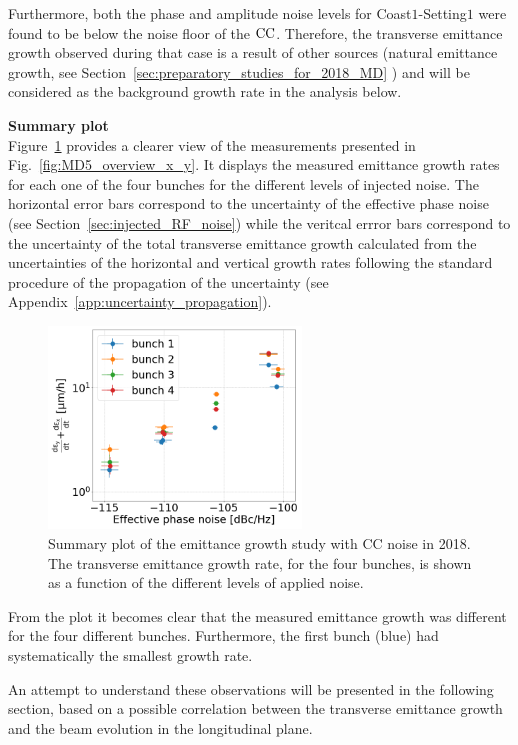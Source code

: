 Furthermore, both the phase and amplitude noise levels for Coast$1$-Setting$1$ were found to be below the noise floor of the ${\mathrm{CC}}$. Therefore, the transverse emittance growth observed during that case is a result of other sources (natural emittance growth, see Section~\ref{sec:preparatory_studies_for_2018_MD} ) and will be considered as the background growth rate in the analysis below. 

\textbf{Summary plot}\\
Figure~\ref{fig:MD5_summary_plot} provides a clearer view of the measurements presented in Fig.~\ref{fig:MD5_overview_x_y}. It displays the measured emittance growth rates for each one of the four bunches for the different levels of injected noise. The horizontal error bars correspond to the uncertainty of the effective phase noise (see Section~\ref{sec:injected_RF_noise}) while the veritcal errror bars correspond to the uncertainty of the total transverse emittance growth calculated from the uncertainties of the horizontal and vertical growth rates following the standard procedure of the propagation of the uncertainty (see Appendix~\ref{app:uncertainty_propagation}).

\begin{figure}[!h]
   \centering         
   \includegraphics[width=0.6\textwidth]{images/Ch5/MD5_summary_plot_no_backg_subtraction.png}
       \caption{Summary plot of the emittance growth study with CC noise in 2018. The transverse emittance growth rate, for the four bunches, is shown as a function of the different levels of applied noise.}
       \label{fig:MD5_summary_plot}
\end{figure}

From the plot it becomes clear that the measured emittance growth was different for the four different bunches. Furthermore, the first bunch (blue) had systematically the smallest growth rate.

An attempt to understand these observations will be presented in the following section, based on a possible correlation between the transverse emittance growth and the beam evolution in the longitudinal plane.

